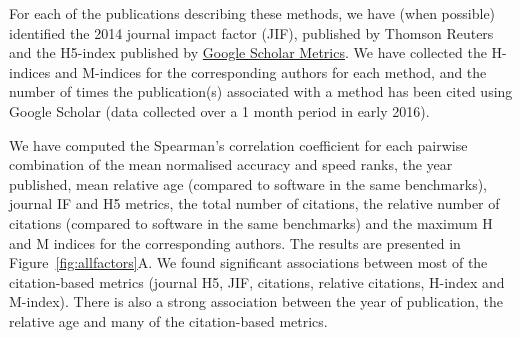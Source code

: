 \documentclass[fleqn,10pt]{SelfArx} %
\begin{document}
For each of the publications describing these methods, we have (when possible) identified the 2014 journal impact factor (JIF), published by Thomson Reuters \cite{Garfield2006-lv} and the H5-index published by \href{https://scholar.google.co.nz/citations?view_op=top_venues\&hl=en}{Google Scholar Metrics}. We have collected the H-indices and M-indices \cite{Hirsch2005-mt} for the corresponding authors for each method, and the number of times the publication(s) associated with a method has been cited using Google Scholar (data collected over a 1 month period in early 2016).

We have computed the Spearman’s correlation coefficient for each pairwise combination of the mean normalised accuracy and speed ranks, the year published, mean relative age (compared to software in the same benchmarks), journal IF and H5 metrics, the total number of citations, the relative number of citations (compared to software in the same benchmarks) and the maximum H and M indices for the corresponding authors. The results are presented in Figure~\ref{fig:allfactors}A. We found significant associations between most of the citation-based metrics (journal H5, JIF, citations, relative citations, H-index and M-index). There is also a strong association between the year of publication, the relative age and many of the citation-based metrics.
\end{document}
